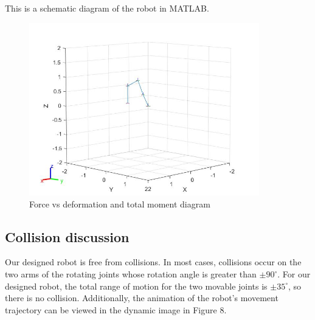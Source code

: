 This is a schematic diagram of the robot in MATLAB.

\begin{figure}[htbp]
    \centering
    \includegraphics[width=10cm]{./fig/1.jpg}
    \caption{Force vs deformation and total moment diagram}
    \label{f4}
\end{figure}

\subsection{Collision discussion}

Our designed robot is free from collisions. In most cases, collisions occur on the two arms of the rotating joints whose rotation angle is greater than $±90^\circ$. For our designed robot, the total range of motion for the two movable joints is $±35^\circ$, so there is no collision. Additionally, the animation of the robot's movement trajectory can be viewed in the dynamic image in Figure 8.

\newpage
